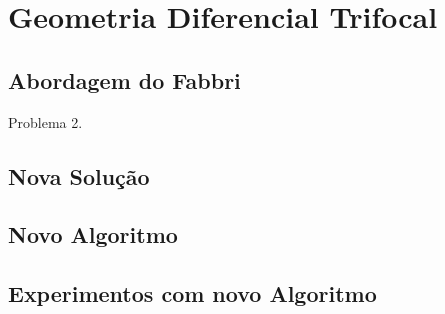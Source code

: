 \section{Geometria Diferencial Trifocal}

\subsection{Abordagem do Fabbri}
Problema 2.

\subsection{Nova Solução}

\subsection{Novo Algoritmo}

\subsection{Experimentos com novo Algoritmo}


